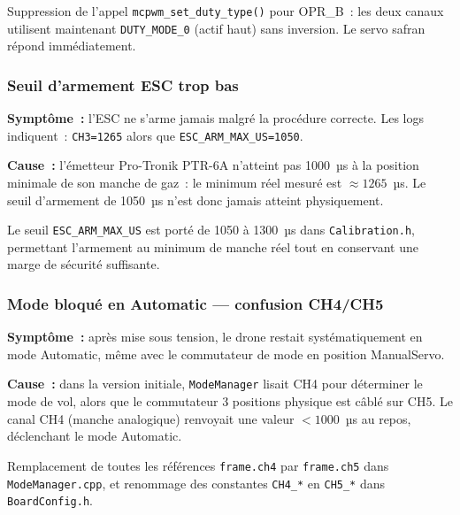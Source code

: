 \documentclass[12pt,a4paper]{article}
\newcommand{\file}[1]{\texttt{#1}}
\begin{document}
\begin{okbox}
  Suppression de l'appel \texttt{mcpwm\_set\_duty\_type()} pour OPR\_B~:
  les deux canaux utilisent maintenant \texttt{DUTY\_MODE\_0} (actif haut)
  sans inversion. Le servo safran répond immédiatement.
\end{okbox}

\subsubsection{Seuil d'armement ESC trop bas}

\begin{warningbox}
  \textbf{Symptôme~:} l'ESC ne s'arme jamais malgré la procédure correcte.
  Les logs indiquent~: \texttt{CH3=1265} alors que
  \texttt{ESC\_ARM\_MAX\_US=1050}.

  \textbf{Cause~:} l'émetteur Pro-Tronik PTR-6A n'atteint pas 1000~µs
  à la position minimale de son manche de gaz~: le minimum réel mesuré
  est $\approx1265$~µs. Le seuil d'armement de 1050~µs n'est donc jamais
  atteint physiquement.
\end{warningbox}

\begin{okbox}
  Le seuil \texttt{ESC\_ARM\_MAX\_US} est porté de 1050 à 1300~µs dans
  \file{Calibration.h}, permettant l'armement au minimum de manche réel
  tout en conservant une marge de sécurité suffisante.
\end{okbox}

\subsubsection{Mode bloqué en Automatic — confusion CH4/CH5}

\begin{warningbox}
  \textbf{Symptôme~:} après mise sous tension, le drone restait
  systématiquement en mode Automatic, même avec le commutateur de mode
  en position ManualServo.

  \textbf{Cause~:} dans la version initiale, \texttt{ModeManager} lisait
  CH4 pour déterminer le mode de vol, alors que le commutateur 3 positions
  physique est câblé sur CH5. Le canal CH4 (manche analogique) renvoyait
  une valeur $< 1000$~µs au repos, déclenchant le mode Automatic.
\end{warningbox}

\begin{okbox}
  Remplacement de toutes les références \texttt{frame.ch4} par
  \texttt{frame.ch5} dans \texttt{ModeManager.cpp}, et renommage des
  constantes \texttt{CH4\_*} en \texttt{CH5\_*} dans \texttt{BoardConfig.h}.
\end{okbox}
\end{document}
